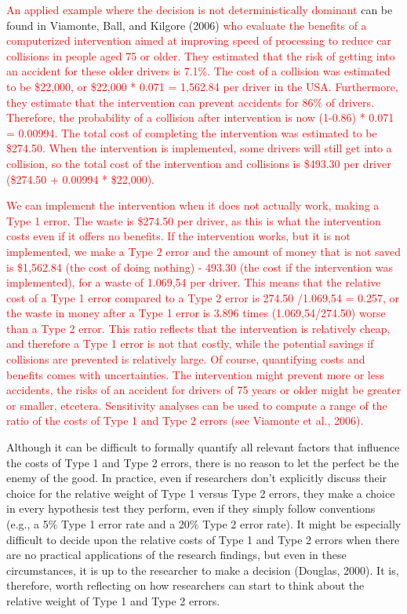 \documentclass[
  english,
  ,man, a4paper,floatsintext]{apa6}
\begin{document}
\textcolor{red}{An applied example where the decision is not deterministically dominant} can be found in Viamonte, Ball, and Kilgore (2006)
\textcolor{red}{who evaluate the benefits of a computerized intervention aimed at improving speed of processing to reduce car collisions in people aged 75 or older. They estimated that the risk of getting into an accident for these older drivers is 7.1\%. The cost of a collision was estimated to be \$22,000, or \$22,000 * 0.071 = 1,562.84 per driver in the USA. Furthermore, they estimate that the intervention can prevent accidents for 86\% of drivers. Therefore, the probability of a collision after intervention is now (1-0.86) * 0.071 = 0.00994. The total cost of completing the intervention was estimated to be \$274.50. When the intervention is implemented, some drivers will still get into a collision, so the total cost of the intervention and collisions is \$493.30 per driver (\$274.50 + 0.00994 * \$22,000).}

\textcolor{red}{We can implement the intervention when it does not actually work, making a Type 1 error. The waste is \$274.50 per driver, as this is what the intervention costs even if it offers no benefits. If the intervention works, but it is not implemented, we make a Type 2 error and the amount of money that is not saved is \$1,562.84 (the cost of doing nothing) - 493.30 (the cost if the intervention was implemented), for a waste of 1.069,54 per driver. This means that the relative cost of a Type 1 error compared to a Type 2 error is 274.50 /1.069,54 = 0.257, or the waste in money after a Type 1 error is 3.896 times (1.069,54/274.50) worse than a Type 2 error. This ratio reflects that the intervention is relatively cheap, and therefore a Type 1 error is not that costly, while the potential savings if collisions are prevented is relatively large. Of course, quantifying costs and benefits comes with uncertainties. The intervention might prevent more or less accidents, the risks of an accident for drivers of 75 years or older might be greater or smaller, etcetera. Sensitivity analyses can be used to compute a range of the ratio of the costs of Type 1 and Type 2 errors (see Viamonte et al., 2006). 
}

Although it can be difficult to formally quantify all relevant factors that influence the costs of Type 1 and Type 2 errors, there is no reason to let the perfect be the enemy of the good. In practice, even if researchers don't explicitly discuss their choice for the relative weight of Type 1 versus Type 2 errors, they make a choice in every hypothesis test they perform, even if they simply follow conventions (e.g., a 5\% Type 1 error rate and a 20\% Type 2 error rate). It might be especially difficult to decide upon the relative costs of Type 1 and Type 2 errors when there are no practical applications of the research findings, but even in these circumstances, it is up to the researcher to make a decision (Douglas, 2000). It is, therefore, worth reflecting on how researchers can start to think about the relative weight of Type 1 and Type 2 errors.
\end{document}

